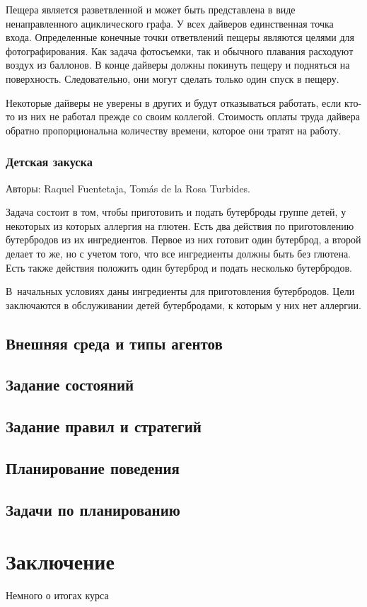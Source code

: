 \documentclass[b5paper,11pt]{book}
\begin{document}
	Пещера является разветвленной и может быть представлена в виде ненаправленного ациклического графа. У всех дайверов единственная точка входа. Определенные конечные точки ответвлений пещеры являются целями для фотографирования. Как задача фотосъемки, так и обычного плавания расходуют воздух из баллонов. В конце дайверы должны покинуть пещеру и подняться на поверхность. Следовательно, они могут сделать только один спуск в пещеру.
	
	Некоторые дайверы не уверены в других и будут отказываться работать, если кто-то из них не работал прежде со своим коллегой. Стоимость оплаты труда дайвера обратно пропорциональна количеству времени, которое они тратят на работу. 
	\subsection{Детская закуска}
	Авторы: Raquel Fuentetaja, Tomás de la Rosa Turbides. 
	
	Задача состоит в том, чтобы приготовить и подать бутерброды группе детей, у некоторых из которых аллергия на глютен. Есть два действия по приготовлению бутербродов из их ингредиентов. Первое из них готовит один бутерброд, а второй делает то же, но с учетом того, что все ингредиенты должны быть без глютена. Есть также действия положить один бутерброд и подать несколько бутербродов. 
	
	В~начальных условиях даны ингредиенты для приготовления бутербродов. Цели заключаются в обслуживании детей бутербродами, к которым у них нет аллергии.
	\section{Внешняя среда и типы агентов}
	\section{Задание состояний}
	\section{Задание правил и стратегий}
	\section{Планирование поведения}
	\section{Задачи по планированию}
	
	

	\chapter*{Заключение}
	Немного о итогах курса
	\printbibliography
\end{document}
